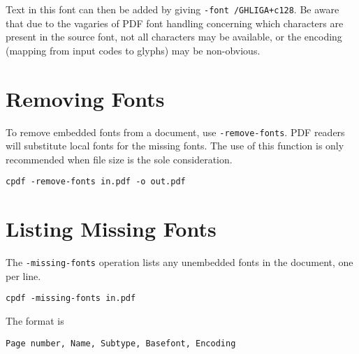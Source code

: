 \documentclass{book}
\begin{document}
\noindent Text in this font can then be added by giving \verb!-font /GHLIGA+c128!. Be
aware that due to the vagaries of PDF font handling concerning which characters
are present in the source font, not all characters may be available, or the
encoding (mapping from input codes to glyphs) may be non-obvious.

\section{Removing Fonts}
\label{removefont}

To remove embedded fonts from a document, use \verb!-remove-fonts!. PDF readers will
substitute local fonts for the missing fonts. The use of this function is only
recommended when file size is the sole consideration.

  \begin{framed}
  \small\noindent\verb!cpdf -remove-fonts in.pdf -o out.pdf!
  \vspace{2.5mm}
  \end{framed}

\section{Listing Missing Fonts}
  The \verb!-missing-fonts! operation lists any unembedded fonts in the document, one per line.
  \begin{framed}
  \small\noindent\verb!cpdf -missing-fonts in.pdf!
  \vspace{2.5mm}
  \end{framed}

  \noindent The format is
  \begin{framed}
  \small\noindent\verb!Page number, Name, Subtype, Basefont, Encoding!
  \vspace{2.5mm}
  \end{framed}

\label{listmisingfonts}
\end{document}
